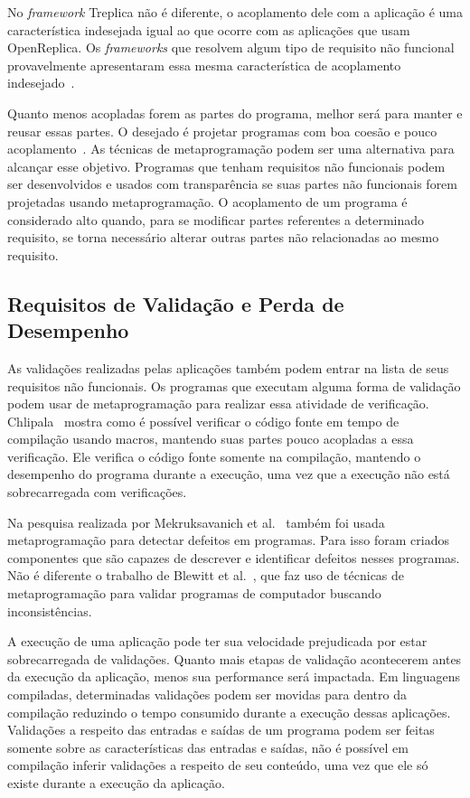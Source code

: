 No \textit{framework} Treplica não é diferente, o acoplamento dele com a aplicação é uma característica indesejada igual ao que ocorre com as aplicações que usam OpenReplica. Os \textit{frameworks} que resolvem algum tipo de requisito não funcional provavelmente apresentaram essa mesma característica de acoplamento indesejado~\cite{eder1994coupling}.

Quanto menos acopladas forem as partes do programa, melhor será para manter e reusar essas partes. O desejado é projetar programas com boa coesão e pouco acoplamento~\cite{hitz1995measuring}. As técnicas de metaprogramação podem ser uma alternativa para alcançar esse objetivo. Programas que tenham requisitos não funcionais podem ser desenvolvidos e usados com transparência se suas partes não funcionais forem projetadas usando metaprogramação. O acoplamento de um programa é considerado alto quando, para se modificar partes referentes a determinado requisito, se torna necessário alterar outras partes não relacionadas ao mesmo requisito.

\subsection{Requisitos de Validação e Perda de Desempenho }

As validações realizadas pelas aplicações também podem entrar na lista de seus requisitos não funcionais. Os programas que executam alguma forma de validação podem usar de metaprogramação para realizar essa atividade de verificação. Chlipala~\cite{chlipala2013bedrock} mostra como é possível verificar o código fonte em tempo de compilação usando macros, mantendo suas partes pouco acopladas a essa verificação. Ele verifica o código fonte somente na compilação, mantendo o desempenho do programa durante a execução, uma vez que a execução não está sobrecarregada com verificações. 

Na pesquisa realizada por Mekruksavanich et al.~\cite{mekruksavanich2012analytical} também foi usada metaprogramação para detectar defeitos em programas. Para isso foram criados componentes que são capazes de descrever e identificar defeitos nesses programas. Não é diferente o trabalho de Blewitt et al.~\cite{blewitt2005automatic}, que faz uso de técnicas de metaprogramação para validar programas de computador buscando inconsistências. 

A execução de uma aplicação pode ter sua velocidade prejudicada por estar sobrecarregada de validações. Quanto mais etapas de validação acontecerem antes da execução da aplicação, menos sua performance será impactada. Em linguagens compiladas, determinadas validações podem ser movidas para dentro da compilação reduzindo o tempo consumido durante a execução dessas aplicações. Validações a respeito das entradas e saídas de um programa podem ser feitas somente sobre as características das entradas e saídas, não é possível em compilação inferir validações a respeito de seu conteúdo, uma vez que ele só existe durante a execução da aplicação.

